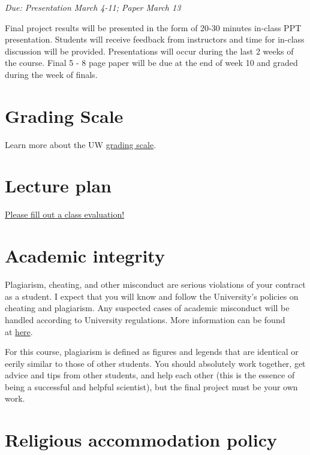 \documentclass[
  letterpaper,
  oneside,
  open=any]{scrbook}
\begin{document}
\emph{Due: Presentation March 4-11; Paper March 13}

Final project results will be presented in the form of 20-30 minutes
in-class PPT presentation. Students will receive feedback from
instructors and time for in-class discussion will be provided.
Presentations will occur during the last 2 weeks of the course. Final 5
- 8 page paper will be due at the end of week 10 and graded during the
week of finals.

\section{Grading Scale}\label{grading-scale}

Learn more about the UW
\href{https://grad.uw.edu/policies-procedures/graduate-school-memoranda/memo-19-grading-system-for-graduate-students/}{grading
scale}.

\section{Lecture plan}\label{lecture-plan}

\href{https://uw.iasystem.org/survey/268860}{Please fill out a class
evaluation!}

\section{Academic integrity}\label{academic-integrity}

Plagiarism, cheating, and other misconduct are serious violations of
your contract as a student. I expect that you will know and follow the
University's policies on cheating and plagiarism. Any suspected cases of
academic misconduct will be handled according to University regulations.
More information can be found\\
at
\href{https://depts.washington.edu/grading/pdf/AcademicResponsibility.pdf}{here}.

For this course, plagiarism is defined as figures and legends that are
identical or eerily similar to those of other students. You should
absolutely work together, get advice and tips from other students, and
help each other (this is the essence of being a successful and helpful
scientist), but the final project must be your own work.

\section{Religious accommodation
policy}\label{religious-accommodation-policy}
\end{document}
